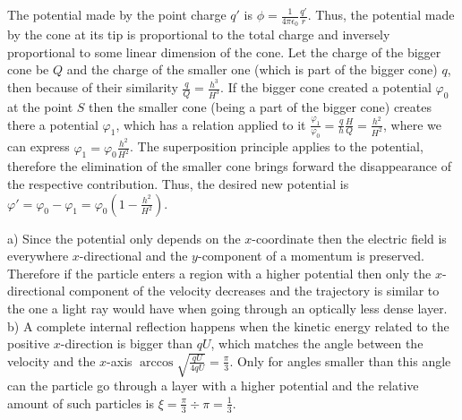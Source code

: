 \documentclass[11pt]{article}
\begin{document}
\probend
\bigskip


\solueng
The potential made by the point charge $q'$ is $\phi = \frac{1}{4 \pi \epsilon_0} \frac{q'}{r}$. Thus, the potential made by the cone at its tip is proportional to the total charge and inversely proportional to some linear dimension of the cone. Let the charge of the bigger cone be $Q$ and the charge of the smaller one (which is part of the bigger cone) $q$, then because of their similarity $\frac{q}{Q} = \frac{h^3}{H^3}$. If the bigger cone created a potential $\varphi_0$ at the point $S$ then the smaller cone (being a part of the bigger cone) creates there a potential $\varphi_1$, which has a relation applied to it $\frac{\varphi_1}{\varphi_0} = \frac{q}{h} \frac{H}{Q} = \frac{h^2}{H^2}$, where we can express $\varphi_1 = \varphi_0 \frac{h^2}{H^2}$. The superposition principle applies to the potential, therefore the elimination of the smaller cone brings forward the disappearance of the respective contribution. Thus, the desired new potential is $\varphi' = \varphi_0 - \varphi_1 = \varphi_0 ( 1 - \frac{h^2}{H^2})$.
\probend
\bigskip


\solueng
a) Since the potential only depends on the $x$-coordinate then the electric field is everywhere $x$-directional and the $y$-component of a momentum is preserved. Therefore if the particle enters a region with a higher potential then only the $x$-directional component of the velocity decreases and the trajectory is similar to the one a light ray would have when going through an optically less dense layer.\\
b) A complete internal reflection happens when the kinetic energy related to the positive $x$-direction is bigger than $qU$, which matches the angle between the velocity and the $x$-axis $\arccos \sqrt{\frac {qU}{4qU}}=\frac \pi 3$. Only for angles smaller than this angle can the particle go through a layer with a higher potential and the relative amount of such particles is $\xi = \frac \pi 3 \div \pi = \frac 13$.
\probend
\bigskip

\end{document}

